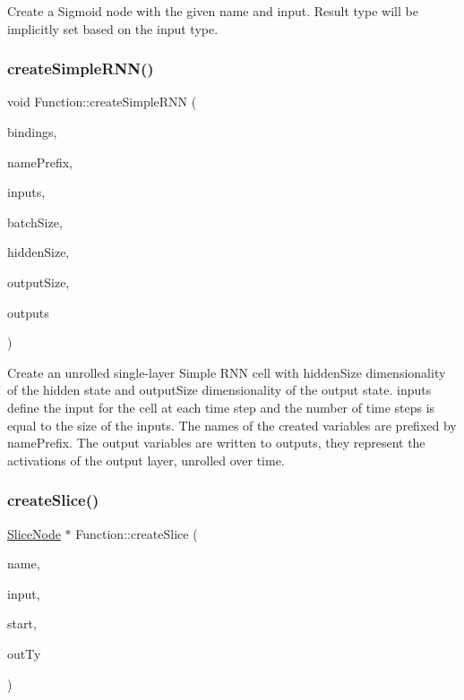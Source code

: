 Create a Sigmoid node with the given {\ttfamily name} and {\ttfamily input}. Result type will be implicitly set based on the {\ttfamily input} type. \mbox{\label{classglow_1_1_function_a5aa2b425049f5e2868062da4ca7c438e}} 
\subsubsection{\texorpdfstring{create\+Simple\+R\+N\+N()}{createSimpleRNN()}}
{\footnotesize\ttfamily void Function\+::create\+Simple\+R\+NN (\begin{DoxyParamCaption}\item[{\hyperlink{classglow_1_1_placeholder_bindings}{Placeholder\+Bindings} \&}]{bindings,  }\item[{llvm\+::\+String\+Ref}]{name\+Prefix,  }\item[{const llvm\+::\+Array\+Ref$<$ \hyperlink{structglow_1_1_node_value}{Node\+Value} $>$}]{inputs,  }\item[{unsigned}]{batch\+Size,  }\item[{unsigned}]{hidden\+Size,  }\item[{unsigned}]{output\+Size,  }\item[{std\+::vector$<$ \hyperlink{structglow_1_1_node_value}{Node\+Value} $>$ \&}]{outputs }\end{DoxyParamCaption})}

Create an unrolled single-\/layer Simple R\+NN cell with {\ttfamily hidden\+Size} dimensionality of the hidden state and {\ttfamily output\+Size} dimensionality of the output state. {\ttfamily inputs} define the input for the cell at each time step and the number of time steps is equal to the size of the {\ttfamily inputs}. The names of the created variables are prefixed by {\ttfamily name\+Prefix}. The output variables are written to {\ttfamily outputs}, they represent the activations of the output layer, unrolled over time. \mbox{\label{classglow_1_1_function_abdff3f5f232d5db7d7b7529516053964}} 
\subsubsection{\texorpdfstring{create\+Slice()}{createSlice()}}
{\footnotesize\ttfamily \hyperlink{classglow_1_1_slice_node}{Slice\+Node} $\ast$ Function\+::create\+Slice (\begin{DoxyParamCaption}\item[{llvm\+::\+String\+Ref}]{name,  }\item[{\hyperlink{structglow_1_1_node_value}{Node\+Value}}]{input,  }\item[{llvm\+::\+Array\+Ref$<$ size\+\_\+t $>$}]{start,  }\item[{\hyperlink{structglow_1_1_type}{Type\+Ref}}]{out\+Ty }\end{DoxyParamCaption})}

